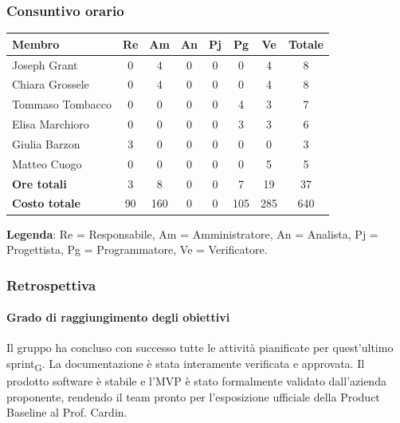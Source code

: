 \documentclass[11pt,a4paper]{article}
\newcommand{\gls}[1]{#1\textsubscript{G}}
\begin{document}
\subsubsection{Consuntivo orario}
\begin{center}
    \begin{tabular}{|l|c|c|c|c|c|c|c|}
        \hline
        \textbf{Membro} & \textbf{Re} & \textbf{Am} & \textbf{An} & \textbf{Pj} & \textbf{Pg} & \textbf{Ve} & \textbf{Totale} \\
        \hline
        Joseph Grant & 0 & 4 & 0 & 0 & 0 & 4 & 8 \\
        \hline
        Chiara Grossele & 0 & 4 & 0 & 0 & 0 & 4 & 8 \\
        \hline
        Tommaso Tombacco & 0 & 0 & 0 & 0 & 4 & 3 & 7 \\
        \hline
        Elisa Marchioro & 0 & 0 & 0 & 0 & 3 & 3 & 6 \\
        \hline
        Giulia Barzon & 3 & 0 & 0 & 0 & 0 & 0 & 3 \\
        \hline
        Matteo Cuogo & 0 & 0 & 0 & 0 & 0 & 5 & 5 \\
        \hline
        \textbf{Ore totali} & 3 & 8 & 0 & 0 & 7 & 19 & 37 \\
        \hline
        \textbf{Costo totale} & 90 & 160 & 0 & 0 & 105 & 285 & 640 \\
        \hline
    \end{tabular}
\end{center}

\noindent \textbf{Legenda}: Re = Responsabile, Am = Amministratore, An = Analista, Pj = Progettista, Pg = Programmatore, Ve = Verificatore.

\subsubsection{Retrospettiva}
\paragraph{Grado di raggiungimento degli obiettivi}
Il gruppo ha concluso con successo tutte le attività pianificate per quest'ultimo \gls{sprint}. La documentazione è stata interamente verificata e approvata. Il prodotto software è stabile e l'MVP è stato formalmente validato dall'azienda proponente, rendendo il team pronto per l'esposizione ufficiale della Product Baseline al Prof. Cardin.
\end{document}

